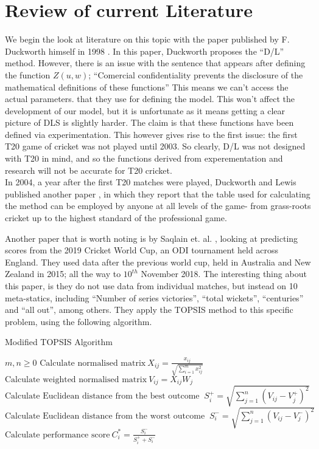 \section{Review of current Literature}
We begin the look at literature on this topic with the paper published by F. Duckworth himself in 1998 \cite{duckworth}. In this paper, 
Duckworth proposes the ``D/L'' method. However, there is an issue with the sentence that appears after defining the function $Z(u,w)$;
``Comercial confidentiality prevents the disclosure of the mathematical definitions of these functions'' This means we can't access the actual parameters. 
that they use for defining the model. This won't affect the development of our model, but it is unfortunate as it means getting a clear picture of DLS is slightly harder.
The claim is that these functions have been defined via experimentation. This however gives rise to the first issue: the first T20 game of cricket was not played until 2003. 
So clearly, D/L was not designed with T20 in mind, and so the functions derived from experementation and research will not be accurate for T20 cricket. \\

In 2004, a year after the first T20 matches were played, Duckworth and Lewis published another paper \cite{duckworth2}, in which they report
that the table used for calculating the method can be employed by anyone at all levels of the game- from grass-roots cricket up to the highest standard of 
the professional game. 

Another paper that is worth noting is by Saqlain et. al. \cite{saqlain}, looking at predicting scores from the 2019 Cricket World Cup, an ODI
tournament held across England. They used data after the previous world cup, held in Australia and New Zealand in 2015; all the way to $10^{th}$ November
2018. The interesting thing about this paper, is they do not use data from individual matches, but instead on 10 meta-statics, including 
``Number of series victories'', ``total wickets'', ``centuries'' and ``all out'', among others. They apply the TOPSIS method to this specific problem, using the 
following algorithm. \\

\begin{algorithm}
\caption{Modified TOPSIS Algorithm}\label{TOPSIS}
\begin{algorithmic}[1]
    \Require $m,n \geq 0$
    \State $\text{Calculate normalised matrix} \ X_{ij} = \frac{x_{ij}}{\sqrt{\sum_{i=1}^mx_{ij}^2}}$
    \State $\text{Calculate weighted normalised matrix} \ V_{ij}=X_{ij}W_j$
        \State $\text{Calculate Euclidean distance from the best outcome } \ S_i^+ = \sqrt{\sum_{j=1}^n(V_{ij}-V_j^+)^2} \ $
        \State $\text{Calculate Euclidean distance from the worst outcome } \ S_i^- = \sqrt{\sum_{j=1}^n(V_{ij}-V_j^-)^2} \ $
    \EndFor
    \State $\text{Calculate performance score} \ C_i^* = \frac{S_i^-}{S_i^+  + S_i^-}$
\end{algorithmic}
\end{algorithm}

